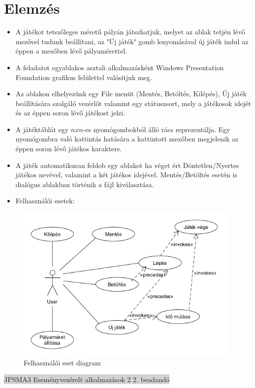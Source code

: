 \documentclass[11pt,a4paper]{article}
\begin{document}
\section{Elemzés}
\begin{itemize}
	\item A játékot tetszőleges méretű pályán játszhatjuk, melyet az ablak tetjén lévő
	mezővel tudunk beállítani, az "Új játék" gomb lenyomásával új játék indul az
	éppen a mezőben lévő pályamérettel.
	\item A feladatot egyablakos asztali alkalmazásként Windows Presentation Foundation grafikus felülettel
	valósítjuk meg.
	\item Az ablakon elhelyezünk egy File menüt (Mentés, Betöltés, Kilépés), Új játék
	beállítására szolgáló vezérlőt valamint egy státuszsort, mely a játékosok idejét és
	az éppen soron lévő játékost jelzi.
	\item A játéktáblát egy $nxn$-es nyomógombokból álló rács reprezentálja. Egy
	nyomógombra való kattintás hatására a kattintott mezőben megjelenik az éppen soron lévő játékos karaktere.
	\item A játék automatikusan feldob egy ablakot ha véget ért Döntetlen/Nyertes játékos
	nevével, valamint a két játékos idejével. Mentés/Betöltés esetén is dialógus ablakban
	történik a fájl kiválasztása.
	\item Felhasználói esetek:
\end{itemize}
\begin{figure}[h]
\centering
\includegraphics[width=11cm]{UMLs/UseCase.png}
\caption{Felhasználói eset diagram}
\end{figure}
\newpage
\thispagestyle{empty}
\begin{center}
\colorbox{lightgray}{{\large JPSMA3} \hspace{3cm} {\large Eseményvezérelt alkalmazások 2 2. beadandó} \hspace{5cm} \thepage}
\end{center}
\end{document}
